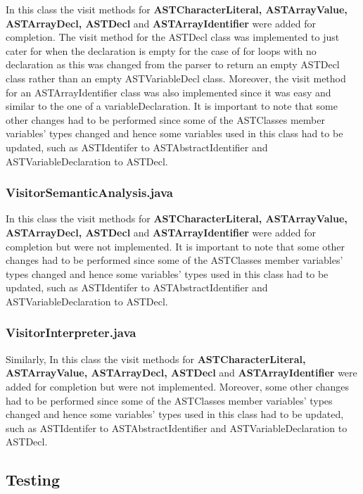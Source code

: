 \documentclass{article}
\begin{document}
				In this class the visit methods for \textbf{ASTCharacterLiteral, ASTArrayValue, ASTArrayDecl, ASTDecl} and \textbf{ASTArrayIdentifier} were added for completion. The visit method for the ASTDecl class was implemented to just cater for when the declaration is empty for the case of for loops with no declaration as this was changed from the parser to return an empty ASTDecl class rather than an empty ASTVariableDecl class. Moreover, the visit method for an ASTArrayIdentifier class was also implemented since it was easy and similar to the one of a variableDeclaration. It is important to note that some other changes had to be performed since some of the ASTClasses member variables' types changed and hence some variables used in this class had to be updated, such as ASTIdentifer to ASTAbstractIdentifier and ASTVariableDeclaration to ASTDecl.
				
				\subsubsection{VisitorSemanticAnalysis.java}
				
				In this class the visit methods for \textbf{ASTCharacterLiteral, ASTArrayValue, ASTArrayDecl, ASTDecl} and \textbf{ASTArrayIdentifier} were added for completion but were not implemented. It is important to note that some other changes had to be performed since some of the ASTClasses member variables' types changed and hence some variables' types used in this class had to be updated, such as ASTIdentifer to ASTAbstractIdentifier and ASTVariableDeclaration to ASTDecl.
				
								\subsubsection{VisitorInterpreter.java}
				
				Similarly, In this class the visit methods for \textbf{ASTCharacterLiteral, ASTArrayValue, ASTArrayDecl, ASTDecl} and \textbf{ASTArrayIdentifier} were added for completion but were not implemented. Moreover, some other changes had to be performed since some of the ASTClasses member variables' types changed and hence some variables' types used in this class had to be updated, such as ASTIdentifer to ASTAbstractIdentifier and ASTVariableDeclaration to ASTDecl.
				
				\subsection{Testing}
				
\end{document}
